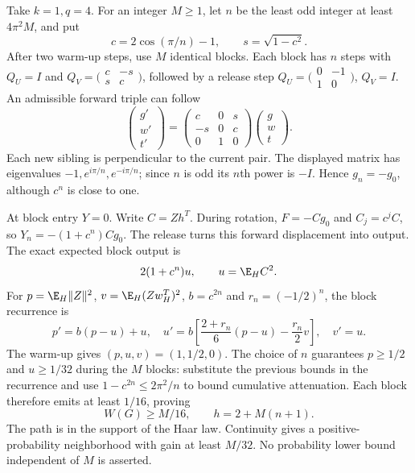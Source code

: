 \documentclass[11pt,oneside,openany,a4paper]{book}
\numberwithin{equation}{chapter}
\theoremstyle{definition}
\theoremstyle{remark}
\begin{document}
Take $k=1,q=4$. For an integer $M\ge1$, let $n$ be the least odd integer at least $4\pi^2M$, and put
\[
 c=2\cos(\pi/n)-1,\qquad s=\sqrt{1-c^2}.
\]
After two warm-up steps, use $M$ identical blocks. Each block has $n$ steps with
$Q_U=I$ and $Q_V=\bigl(\begin{smallmatrix}c&-s\\s&c\end{smallmatrix}\bigr)$, followed by a release step $Q_U=\bigl(\begin{smallmatrix}0&-1\\1&0\end{smallmatrix}\bigr)$, $Q_V=I$. An admissible forward triple can follow
\begin{equation}\label{base:new:amplifier-triple}
 \begin{pmatrix}g'\\w'\\t'\end{pmatrix}
 =\begin{pmatrix}c&0&s\\-s&0&c\\0&1&0\end{pmatrix}
 \begin{pmatrix}g\\w\\t\end{pmatrix}.
\end{equation}
Each new sibling is perpendicular to the current pair. The displayed matrix has eigenvalues $-1,e^{i\pi/n},e^{-i\pi/n}$; since $n$ is odd its $n$th power is $-I$. Hence $g_n=-g_0$, although $c^n$ is close to one.

At block entry $Y=0$. Write $C=Zh^T$. During rotation, $F=-Cg_0$ and $C_j=c^jC$, so $Y_n=-(1+c^n)Cg_0$. The release turns this forward displacement into output. The exact expected block output is
\begin{equation}\label{base:new:amplifier-output}
 2(1+c^n)u,\qquad u=\E_H C^2.
\end{equation}
For $p=\E_H\|Z\|^2$, $v=\E_H(Zw_H^T)^2$, $b=c^{2n}$ and $r_n=(-1/2)^n$, the block recurrence is
\[
 p'=b(p-u)+u,\quad
 u'=b\left[\frac{2+r_n}{6}(p-u)-\frac{r_n}{2}v\right],\quad v'=u.
\]
The warm-up gives $(p,u,v)=(1,1/2,0)$. The choice of $n$ guarantees $p\ge1/2$ and $u\ge1/32$ during the $M$ blocks: substitute the previous bounds in the recurrence and use $1-c^{2n}\le2\pi^2/n$ to bound cumulative attenuation. Each block therefore emits at least $1/16$, proving
\begin{equation}\label{base:new:conditional-unbounded}
 W(G)\ge M/16,\qquad h=2+M(n+1).
\end{equation}
The path is in the support of the Haar law. Continuity gives a positive-probability neighborhood with gain at least $M/32$. No probability lower bound independent of $M$ is asserted.
\end{document}
